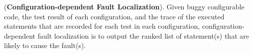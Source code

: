 \begin{Definition}{({\bf Configuration-dependent Fault Localization}).}
Given buggy configurable code, the test result of each configuration,
and the trace of the executed statements that are recorded for each
test in each configuration, configuration-dependent fault localization
is to output the ranked list of statement(s) that are likely to cause
the fault(s).
\end{Definition}



